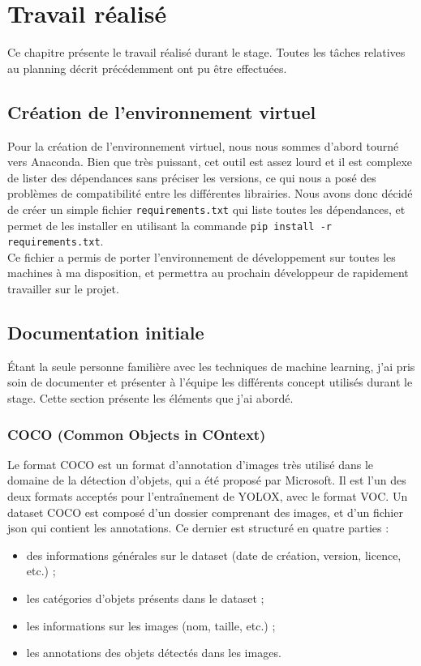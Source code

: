 \chapter{Travail réalisé}

Ce chapitre présente le travail réalisé durant le stage. Toutes les tâches relatives au planning 
décrit précédemment ont pu être effectuées. 

\section{Création de l'environnement virtuel}

Pour la création de l'environnement virtuel, nous nous sommes d'abord tourné vers Anaconda. 
Bien que très puissant, cet outil est assez lourd et il est complexe de lister des dépendances
sans préciser les versions, ce qui nous a posé des problèmes de compatibilité entre les différentes 
librairies. 
Nous avons donc décidé de créer un simple fichier \texttt{requirements.txt} qui liste
toutes les dépendances, et permet de les installer en utilisant la commande \texttt{pip install -r requirements.txt}.\\

Ce fichier a permis de porter l'environnement de développement sur toutes les machines 
à ma disposition, et permettra au prochain développeur de rapidement travailler sur le projet.

\section{Documentation initiale}

Étant la seule personne familière avec les techniques de machine learning, j'ai pris soin de documenter
et présenter à l'équipe les différents concept utilisés durant le stage. Cette section présente
les éléments que j'ai abordé.

\subsection{COCO (Common Objects in COntext)}

Le format COCO \cite{Lin-Maire-Belongie-Bourdev-Girshick-Hays-Perona-Ramanan-Zitnick-Dollar-2015}
est un format d'annotation d'images très utilisé dans le domaine de la détection d'objets, 
qui a été proposé par Microsoft.
Il est l'un des deux formats acceptés pour l'entraînement de YOLOX, avec le format VOC.
Un dataset COCO est composé d'un dossier comprenant des images, et d'un fichier json qui contient les annotations.
Ce dernier est structuré en quatre parties :
\begin{itemize}
    \item des informations générales sur le dataset (date de création, version, licence, etc.) ;
    \item les catégories d'objets présents dans le dataset ;
    \item les informations sur les images (nom, taille, etc.) ;
    \item les annotations des objets détectés dans les images.
\end{itemize}

